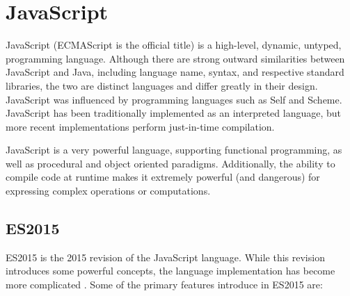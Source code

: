 \section{JavaScript}

JavaScript (ECMAScript is the official title) is a high-level, dynamic, untyped, programming language. Although there are strong outward similarities between JavaScript and Java, including language name, syntax, and respective standard libraries, the two are distinct languages and differ greatly in their design. JavaScript was influenced by programming languages such as Self and Scheme. JavaScript has been traditionally implemented as an interpreted language, but more recent implementations perform just-in-time compilation. \cite{javascript16}

JavaScript is a very powerful language, supporting functional programming, as well as procedural and object oriented paradigms.  Additionally, the ability to compile code at runtime makes it extremely powerful (and dangerous) for expressing complex operations or computations. \cite{eval16} 

\subsection{ES2015}
ES2015 is the 2015 revision of the JavaScript language. While this revision introduces some powerful concepts, the language implementation has become more complicated \cite{arrowfn16} \cite{let16} \cite{destructuring16}.  Some of the primary features introduce in ES2015 are:

